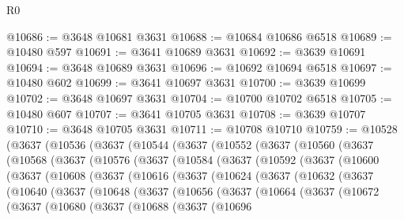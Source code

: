 \begin{lexlean}{R0}
\begin{coremodule}
@10686 := @3648 @10681 @3631
@10688 := @10684 @10686 @6518
@10689 := @10480 @597
@10691 := @3641 @10689 @3631
@10692 := @3639 @10691
@10694 := @3648 @10689 @3631
@10696 := @10692 @10694 @6518
@10697 := @10480 @602
@10699 := @3641 @10697 @3631
@10700 := @3639 @10699
@10702 := @3648 @10697 @3631
@10704 := @10700 @10702 @6518
@10705 := @10480 @607
@10707 := @3641 @10705 @3631
@10708 := @3639 @10707
@10710 := @3648 @10705 @3631
@10711 := @10708 @10710
@10759 := @10528
    (@3637
      (@10536
        (@3637
          (@10544
            (@3637
              (@10552
                (@3637
                  (@10560
                    (@3637
                      (@10568
                        (@3637
                          (@10576
                            (@3637
                              (@10584
                                (@3637
                                  (@10592
                                    (@3637
                                      (@10600
                                        (@3637
                                          (@10608
                                            (@3637
                                              (@10616
                                                (@3637
                                                  (@10624
                                                    (@3637
                                                      (@10632
                                                        (@3637
                                                          (@10640
                                                            (@3637
                                                              (@10648
                                                                (@3637
                                                                  (@10656
                                                                    (@3637
                                                                      (@10664
                                                                        (@3637
                                                                          (@10672
                                                                            (@3637
                                                                              (@10680
                                                                                (@3637
                                                                                  (@10688
                                                                                    (@3637
                                                                                      (@10696

\end{coremodule}
\end{lexlean}
